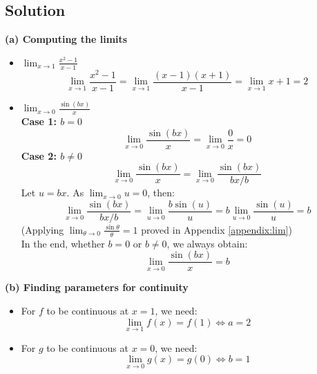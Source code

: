 \subsection*{Solution}
\textbf{(a) Computing the limits}
\begin{itemize}
    \item $\displaystyle \lim_{x \to 1} \frac{x^2-1}{x-1}$
    \[ \lim_{x \to 1} \frac{x^2-1}{x-1} = \lim_{x \to 1} \frac{(x-1)(x+1)}{x-1} = \lim_{x \to 1} x+1 = 2 \]
    \item $\displaystyle \lim_{x \to 0} \frac{\sin(bx)}{x}$ \\
    \textbf{Case 1: $b = 0$}
    \[ \lim_{x \to 0} \frac{\sin(bx)}{x} = \lim_{x \to 0} \frac{0}{x} = 0 \]
    \textbf{Case 2: $b \neq 0$}
    \[ \lim_{x \to 0} \frac{\sin(bx)}{x} = \lim_{x \to 0} \frac{\sin(bx)}{bx/b} \]
    Let $u = bx$. As $\displaystyle \lim_{x \to 0} u = 0$, then:
    \[ \lim_{x \to 0} \frac{\sin(bx)}{bx/b} = \lim_{u \to 0} \frac{b\sin(u)}{u} = b\lim_{u \to 0} \frac{\sin(u)}{u} = b \]
    (Applying $\displaystyle \lim_{\theta \to 0} \frac{\sin \theta}{\theta} = 1$ proved in Appendix \ref{appendix:lim}) \\
    In the end, whether $b = 0$ or $b \neq 0$, we always obtain:
    \[ \lim_{x \to 0} \frac{\sin(bx)}{x} = b \]
\end{itemize}

\textbf{(b) Finding parameters for continuity}
\begin{itemize}
    \item For $f$ to be continuous at $x = 1$, we need:
    \[ \lim_{x \to 1} f(x) = f(1) \Longleftrightarrow \boxed{a = 2} \]
    \item For $g$ to be continuous at $x = 0$, we need:
    \[ \lim_{x \to 0} g(x) = g(0) \Longleftrightarrow \boxed{b = 1}\]
\end{itemize}

